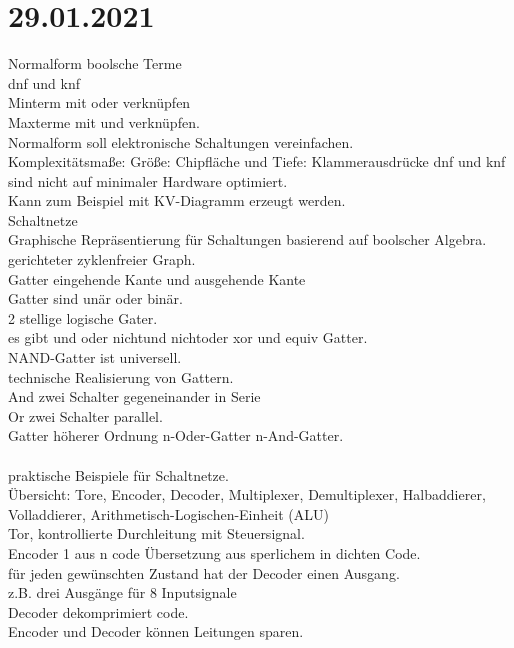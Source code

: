 \documentclass{article}
\begin{document}
	\section*{29.01.2021}
	Normalform boolsche Terme \\
	dnf und knf \\
	Minterm mit oder verknüpfen \\
	Maxterme mit und verknüpfen. \\
	Normalform soll elektronische Schaltungen vereinfachen. \\
	Komplexitätsmaße: Größe: Chipfläche und Tiefe: Klammerausdrücke
	dnf und knf sind nicht auf minimaler Hardware optimiert. \\
	Kann zum Beispiel mit KV-Diagramm erzeugt werden. \\
	Schaltnetze \\
	Graphische Repräsentierung für Schaltungen basierend auf boolscher Algebra. \\
	gerichteter zyklenfreier Graph. \\
	Gatter eingehende Kante und ausgehende Kante \\
	Gatter sind unär oder binär. \\
	2 stellige logische Gater. \\
	es gibt und oder nichtund nichtoder xor und equiv Gatter. \\ 
	NAND-Gatter ist universell. \\
	technische Realisierung von Gattern. \\
	And zwei Schalter gegeneinander in Serie \\
	Or zwei Schalter parallel. \\
	Gatter höherer Ordnung n-Oder-Gatter n-And-Gatter. \\
	\\
	praktische Beispiele für Schaltnetze. \\
	Übersicht:
	Tore, Encoder, Decoder, Multiplexer, Demultiplexer, Halbaddierer, Volladdierer, Arithmetisch-Logischen-Einheit (ALU) \\
	Tor, kontrollierte Durchleitung mit Steuersignal. \\
	Encoder 1 aus n code Übersetzung aus sperlichem in dichten Code. \\
	für jeden gewünschten Zustand hat der Decoder einen Ausgang. \\
	z.B. drei Ausgänge für 8 Inputsignale \\
	Decoder dekomprimiert code. \\
	Encoder und Decoder können Leitungen sparen. \\
\end{document}
